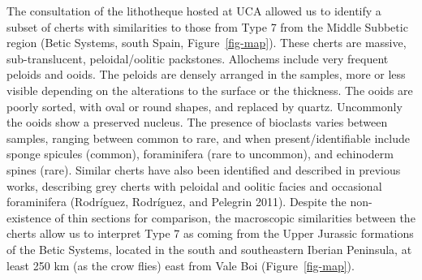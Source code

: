 \documentclass[
  a4paper,
  DIV=11,
  numbers=noendperiod]{scrreprt}
\begin{document}
The consultation of the lithotheque hosted at UCA allowed us to identify
a subset of cherts with similarities to those from Type 7 from the
Middle Subbetic region (Betic Systems, south Spain,
Figure~\ref{fig-map}). These cherts are massive, sub-translucent,
peloidal/oolitic packstones. Allochems include very frequent peloids and
ooids. The peloids are densely arranged in the samples, more or less
visible depending on the alterations to the surface or the thickness.
The ooids are poorly sorted, with oval or round shapes, and replaced by
quartz. Uncommonly the ooids show a preserved nucleus. The presence of
bioclasts varies between samples, ranging between common to rare, and
when present/identifiable include sponge spicules (common), foraminifera
(rare to uncommon), and echinoderm spines (rare). Similar cherts have
also been identified and described in previous works, describing grey
cherts with peloidal and oolitic facies and occasional foraminifera
(Rodríguez, Rodríguez, and Pelegrin 2011). Despite the non-existence of
thin sections for comparison, the macroscopic similarities between the
cherts allow us to interpret Type 7 as coming from the Upper Jurassic
formations of the Betic Systems, located in the south and southeastern
Iberian Peninsula, at least 250 km (as the crow flies) east from Vale
Boi (Figure~\ref{fig-map}).
\end{document}
